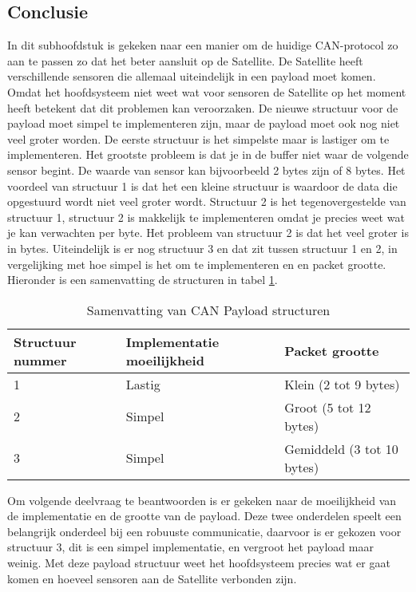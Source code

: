 \subsection{Conclusie}
In dit subhoofdstuk is gekeken naar een manier om de huidige CAN-protocol zo aan te passen zo dat het beter aansluit op de Satellite. De Satellite heeft verschillende sensoren die allemaal uiteindelijk in een payload moet komen. Omdat het hoofdsysteem niet weet wat voor sensoren de Satellite op het moment heeft betekent dat dit problemen kan veroorzaken. De nieuwe structuur voor de payload moet simpel te implementeren zijn, maar de payload moet ook nog niet veel groter worden. De eerste structuur is het simpelste maar is lastiger om te implementeren. Het grootste probleem is dat je in de buffer niet waar de volgende sensor begint. De waarde van sensor kan bijvoorbeeld 2 bytes zijn of 8 bytes. Het voordeel van structuur 1 is dat het een kleine structuur is waardoor de data die opgestuurd wordt niet veel groter wordt. Structuur 2 is het tegenovergestelde van structuur 1, structuur 2 is makkelijk te implementeren omdat je precies weet wat je kan verwachten per byte. Het probleem van structuur 2 is dat het veel groter is in bytes. Uiteindelijk is er nog structuur 3 en dat zit tussen structuur 1 en 2, in vergelijking met hoe simpel is het om te implementeren en en packet grootte. Hieronder is een samenvatting de structuren in tabel \ref{tab:samenvattingstructuur}.

\begin{table}[h!]
	\centering
	\caption{Samenvatting van CAN Payload structuren}
	\label{tab:samenvattingstructuur}
	\begin{tabular}{lll}
	\toprule
		Structuur nummer & Implementatie moeilijkheid & Packet grootte             \\ \midrule
		1                & Lastig                     & Klein (2 tot 9 bytes)      \\
		2                & Simpel                     & Groot (5 tot 12 bytes)     \\
		3                & Simpel                     & Gemiddeld (3 tot 10 bytes) \\ \bottomrule
	\end{tabular}%
\end{table}

\noindent Om volgende deelvraag te beantwoorden is er gekeken naar de moeilijkheid van de implementatie en de grootte van de payload. Deze twee onderdelen speelt een belangrijk onderdeel bij een robuuste communicatie, daarvoor is er gekozen voor structuur 3, dit is een simpel implementatie, en vergroot het payload maar weinig. Met deze payload structuur weet het hoofdsysteem precies wat er gaat komen en hoeveel sensoren aan de Satellite verbonden zijn.